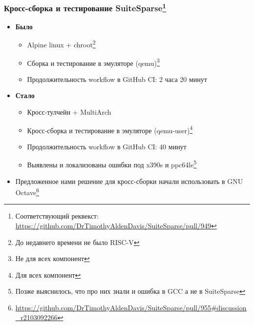 \documentclass[xcolor=table,aspectratio=169]{beamer}
\begin{document}
\begin{frame}[fragile]
  \frametitle{Кросс-сборка и тестирование SuiteSparse\footnote{Соответствующий реквекст: \url{https://github.com/DrTimothyAldenDavis/SuiteSparse/pull/949}}}
  \begin{itemize}
    \item \textbf{Было}
    \begin{itemize}
      \item Alpine linux + chroot\footnote{До недавнего времени не было RISC-V}
      \item Сборка и тестирование в эмуляторе (qemu)\footnote{Не для всех компонент}
      \item Продолжительность workflow в GitHub CI: 2 часа 20 минут
    \end{itemize}
    \pause
    \vfill
    \item \textbf{Стало}
      \begin{itemize}
        \item Кросс-тулчейн + MultiArch
        \item Кросс-сборка и тестирование в эмуляторе (qemu-user)\footnote{Для всех компонент}
        \item Продолжительность workflow в GitHub CI: 40 минут
        \item Выявлены и локализованы ошибки под x390s и ppc64le\footnote{Позже выяснилось, что про них знали и ошибка в GCC а не в SuiteSparse}
      \end{itemize}
    \pause
    \item Предложенное нами решение для кросс-сборки начали использовать в GNU Octave\footnote{\url{https://github.com/DrTimothyAldenDavis/SuiteSparse/pull/955\#discussion_r2103092266}}
  \end{itemize}
\end{frame}
\end{document}
